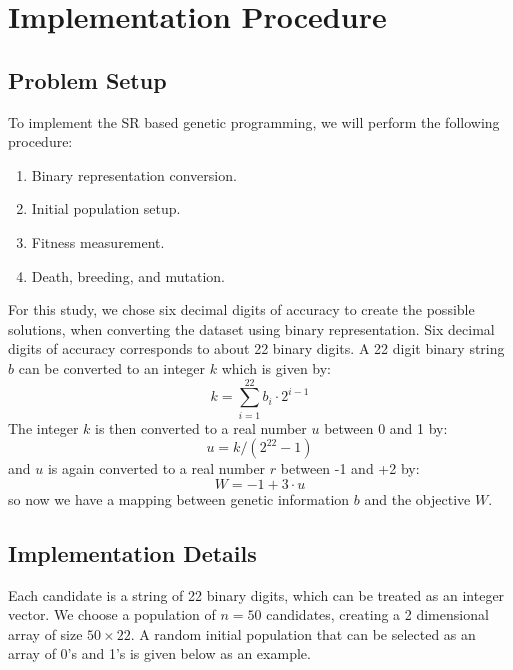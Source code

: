 \documentclass[10pt,journal,compsoc]{IEEEtran}
\begin{document}
\section{Implementation Procedure}\label{sec:experiments}




\subsection{Problem Setup}

To implement the SR based genetic programming, we will perform the following procedure:
     	\begin{enumerate}
     		\item  Binary representation conversion. 
     		\vskip 0.1in
     		\item  Initial population setup.
     		\vskip 0.1in
     		\item  Fitness measurement.
     		\vskip 0.1in
     		\item  Death, breeding, and mutation.
     	\end{enumerate}
     	
For this study, we chose six decimal digits of accuracy to create the possible solutions, when converting the dataset using binary representation. Six decimal digits of accuracy corresponds to about
		22 binary digits. A 22 digit binary string $b$ can be converted
		to an integer $k$ which is given by:
\begin{equation}
		k = \sum_{i=1}^{22} b_i \cdot 2^{i-1}
\end{equation}
		The integer $k$ is then converted to a real number $u$ between 0 and 1 by:
\begin{equation}	
		u = k / ( 2^{22}-1)
\end{equation}
		and $u$ is again  converted to a real number $r$ between -1 and +2 by:
\begin{equation}	
		W = -1 + 3 \cdot u
\end{equation}
		so now we have a mapping between genetic information $b$ and
		the objective $W$.

\subsection{Implementation Details}

		Each candidate is a string of 22 binary digits, which can be treated as an integer vector.
		\vskip 0.1in
		We choose a population of $n = 50$ candidates, creating a 2 dimensional array of size $50 \times 22$.
		\vskip 0.1in
		A random initial population that can be selected as an array of 0's and 1's is given below as an example.
		
\end{document}
